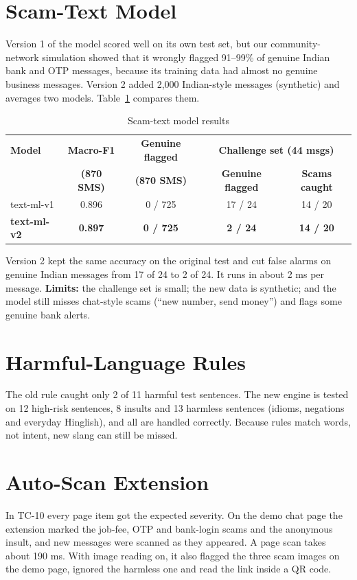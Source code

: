 \section{Scam-Text Model}\label{sec:textres}
\noindent Version 1 of the model scored well on its own test set, but our community-network simulation showed that it wrongly flagged 91--99\% of genuine Indian bank and OTP messages, because its training data had almost no genuine business messages. Version 2 added 2,000 Indian-style messages (synthetic) and averages two models. Table~\ref{tab:text} compares them.

\begin{table}[H]
\centering
\small
\renewcommand{\arraystretch}{1.15}
\caption{Scam-text model results}
\label{tab:text}
\begin{tabular}{|l|c|c|c|c|}
\hline
\textbf{Model} & \textbf{Macro-F1} & \textbf{Genuine flagged} & \multicolumn{2}{c|}{\textbf{Challenge set (44 msgs)}} \\
 & \textbf{(870 SMS)} & \textbf{(870 SMS)} & \textbf{Genuine flagged} & \textbf{Scams caught} \\ \hline
text-ml-v1 & 0.896 & 0 / 725 & 17 / 24 & 14 / 20 \\ \hline
\textbf{text-ml-v2} & \textbf{0.897} & \textbf{0 / 725} & \textbf{2 / 24} & \textbf{14 / 20} \\ \hline
\end{tabular}
\end{table}

\noindent Version 2 kept the same accuracy on the original test and cut false alarms on genuine Indian messages from 17 of 24 to 2 of 24. It runs in about 2 ms per message. \textbf{Limits:} the challenge set is small; the new data is synthetic; and the model still misses chat-style scams (``new number, send money'') and flags some genuine bank alerts.

\section{Harmful-Language Rules}
\noindent The old rule caught only 2 of 11 harmful test sentences. The new engine is tested on 12 high-risk sentences, 8 insults and 13 harmless sentences (idioms, negations and everyday Hinglish), and all are handled correctly. Because rules match words, not intent, new slang can still be missed.

\section{Auto-Scan Extension}
\noindent In TC-10 every page item got the expected severity. On the demo chat page the extension marked the job-fee, OTP and bank-login scams and the anonymous insult, and new messages were scanned as they appeared. A page scan takes about 190 ms. With image reading on, it also flagged the three scam images on the demo page, ignored the harmless one and read the link inside a QR code.

